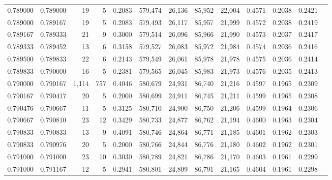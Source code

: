 \begin{tabular}{rrrrrrrrrrrrr}
0.789000 & 0.789000 &    19 &   5 &                                     0.2083 & 579,474 &  26,136 &  85,952 &  22,004 & 0.4571 & 0.2038 & 0.2421 \\
0.789000 & 0.789167 &    19 &   5 &                                     0.2083 & 579,493 &  26,117 &  85,957 &  21,999 & 0.4572 & 0.2038 & 0.2419 \\
0.789167 & 0.789333 &    21 &   9 &                                     0.3000 & 579,514 &  26,096 &  85,966 &  21,990 & 0.4573 & 0.2037 & 0.2417 \\
0.789333 & 0.789452 &    13 &   6 &                                     0.3158 & 579,527 &  26,083 &  85,972 &  21,984 & 0.4574 & 0.2036 & 0.2416 \\
0.789500 & 0.789833 &    22 &   6 &                                     0.2143 & 579,549 &  26,061 &  85,978 &  21,978 & 0.4575 & 0.2036 & 0.2414 \\
0.789833 & 0.790000 &    16 &   5 &                                     0.2381 & 579,565 &  26,045 &  85,983 &  21,973 & 0.4576 & 0.2035 & 0.2413 \\
0.790000 & 0.790167 & 1,114 & 757 &                                     0.4046 & 580,679 &  24,931 &  86,740 &  21,216 & 0.4597 & 0.1965 & 0.2309 \\
0.790167 & 0.790417 &    20 &   5 &                                     0.2000 & 580,699 &  24,911 &  86,745 &  21,211 & 0.4599 & 0.1965 & 0.2308 \\
0.790476 & 0.790667 &    11 &   5 &                                     0.3125 & 580,710 &  24,900 &  86,750 &  21,206 & 0.4599 & 0.1964 & 0.2306 \\
0.790667 & 0.790810 &    23 &  12 &                                     0.3429 & 580,733 &  24,877 &  86,762 &  21,194 & 0.4600 & 0.1963 & 0.2304 \\
0.790833 & 0.790833 &    13 &   9 &                                     0.4091 & 580,746 &  24,864 &  86,771 &  21,185 & 0.4601 & 0.1962 & 0.2303 \\
0.790833 & 0.790976 &    20 &   5 &                                     0.2000 & 580,766 &  24,844 &  86,776 &  21,180 & 0.4602 & 0.1962 & 0.2301 \\
0.791000 & 0.791000 &    23 &  10 &                                     0.3030 & 580,789 &  24,821 &  86,786 &  21,170 & 0.4603 & 0.1961 & 0.2299 \\
0.791000 & 0.791167 &    12 &   5 &                                     0.2941 & 580,801 &  24,809 &  86,791 &  21,165 & 0.4604 & 0.1961 & 0.2298 \\

\end{tabular}
